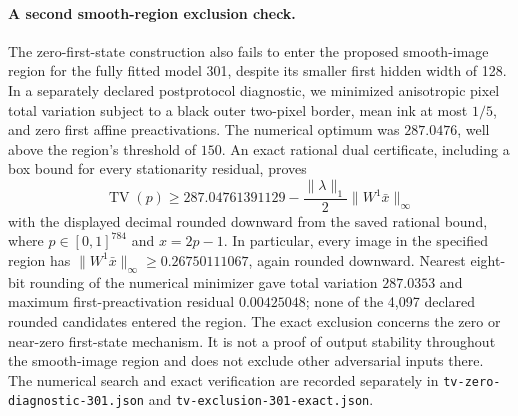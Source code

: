 \paragraph{A second smooth-region exclusion check.}
The zero-first-state construction also fails to enter the proposed
smooth-image region for the fully fitted model 301, despite its smaller
first hidden width of 128. In a separately declared postprotocol
diagnostic, we minimized anisotropic pixel total variation subject to
a black outer two-pixel border, mean ink at most $1/5$, and zero first
affine preactivations. The numerical optimum was $287.0476$, well above
the region's threshold of $150$. An exact rational dual certificate,
including a box bound for every stationarity residual, proves
\[
 \operatorname{TV}(p)\ge287.04761391129
   -\frac{\|\lambda\|_1}{2}
             \|W^1\bar x\|_\infty
\]
with the displayed decimal rounded downward from the saved rational
bound, where $p\in[0,1]^{784}$ and $x=2p-1$.
In particular, every image in the specified region has
$\|W^1\bar x\|_\infty\ge0.26750111067$, again rounded downward.
Nearest eight-bit rounding of the numerical minimizer gave total
variation $287.0353$ and maximum first-preactivation residual
$0.00425048$; none of the 4,097 declared rounded candidates entered
the region. The exact exclusion concerns the zero or near-zero
first-state mechanism. It is not a proof of output stability throughout
the smooth-image region and does not exclude other adversarial inputs
there. The numerical search and exact verification are recorded
separately in \texttt{tv-zero-diagnostic-301.json} and
\texttt{tv-exclusion-301-exact.json}.
